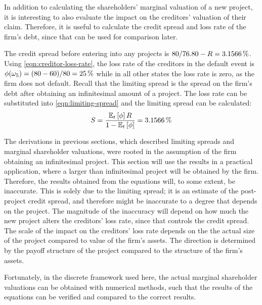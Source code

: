 \documentclass[main.tex]{subfiles}
\begin{document}
    In addition to calculating the shareholders' marginal valuation of a new project,
    it is interesting to also evaluate the impact on the creditors' valuation of their claim. 
    Therefore, it is useful to calculate the credit spread and loss rate of the firm's debt,
    since that can be used for comparison later.

    The credit spread before entering into any projects is 
    $\num{80}/\num{76.80} - \grossrfrate = \pct{0.031566}$.
    Using \cref{eqn:creditor-loss-rate}, the loss rate of the creditors in the default event is
    $\phi(\omega_{5}) = (\num{80}-\num{60})/\num{80} = \pct{0.25}$
    while in all other states the loss rate is zero, as the firm does not default.
    Recall that the limiting spread is the spread on the firm's debt 
    after obtaining an infinitesimal amount of a project. 
    The loss rate can be substituted into \cref{eqn:limiting-spread} 
    and the limiting spread can be calculated:
        \begin{equation}
            S
            =
            \frac{
                \mathbb{E}_{t}\left[\phi\right]
                R
            }{
                1 
                -
                \mathbb{E}_{t}\left[\phi\right] 
            } 
            =
            \pct{0.031566}
        \end{equation}

    The derivations in previous sections, 
    which described limiting spreads and marginal shareholder valuations, 
    were rooted in the assumption of the firm obtaining an infinitesimal project.
    This section will use the results in a practical application,
    where a larger than infinitesimal project will be obtained by the firm.
    Therefore, the results obtained from the equations will, to some extent, be inaccurate.
    This is solely due to the limiting spread;
    it is an estimate of the post-project credit spread,
    and therefore might be inaccurate to a degree that depends on the project.
    The magnitude of the inaccuracy will depend on how much the new project alters
    the creditors' loss rate, since that controls the credit spread.
    The scale of the impact on the creditors' loss rate 
    depends on the the actual size of the project compared to value of the firm's assets.
    The direction is determined by the payoff structure of the project
    compared to the structure of the firm's assets.

    Fortunately, in the discrete framework used here, 
    the actual marginal shareholder valuations can be obtained with numerical methods,
    such that the results of the equations can be verified and compared to the correct results.
\end{document}
